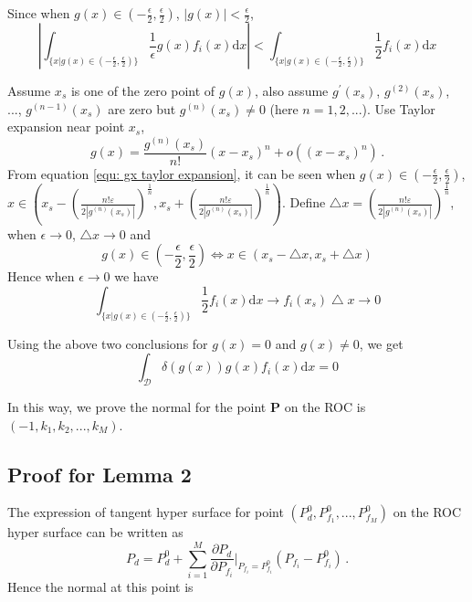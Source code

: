 \documentclass[12pt,journal,a4paper,twoside,onecolumn]{IEEEtran}
\begin{document}
\begin{spacing}{2.5}
Since when $g(x) \in (-\frac{\epsilon}{2}, \frac{\epsilon}{2})$, $|g(x)| < \frac{\epsilon}{2}$,
\begin{equation}|
\int_{\{x|g(x)\in (-\frac{\epsilon}{2}, \frac{\epsilon}{2})\}} \frac{1}{\epsilon} g(x)f_i(x) \mathrm{d}x | <
\int_{\{x|g(x)\in (-\frac{\epsilon}{2}, \frac{\epsilon}{2})\}} \frac{1}{2}f_i(x) \mathrm{d}x
\end{equation}

Assume $x_s$ is one of the zero point of $g(x)$, also assume $g^\prime(x_s)$, $g^{(2)}(x_s)$, ..., $g^{(n-1)}(x_s)$ are zero but $g^{(n)}(x_s) \neq 0$ (here $n = 1, 2, ...$). Use Taylor expansion near point $x_s$,
\begin{equation}
  \label{equ: gx taylor expansion}
  g(x) = \frac{g^{(n)}(x_s)}{n!}(x - x_s)^n + o((x - x_s)^n)\,.
\end{equation}
\def \LEFT{ x_s
  -\left(\frac{n!\varepsilon}{2|g^{(n)}(x_s)|}\right)^{\frac{1}{n}}}
  \def \RIGHT{ x_s
  +\left(\frac{n!\varepsilon}{2|g^{(n)}(x_s)|}\right)^{\frac{1}{n}}}
From equation \eqref{equ: gx taylor expansion}, it can be seen when $g(x)\in (-\frac{\epsilon}{2}, \frac{\epsilon}{2})$, $x \in \left(
      \LEFT, \RIGHT
  \right)$.  Define $\bigtriangleup x = \left(\frac{n!\varepsilon}{2|g^{(n)}(x_s)|}\right)^{\frac{1}{n}}$, when $\epsilon \rightarrow 0$, $\bigtriangleup x \rightarrow 0$ and
\begin{equation}
\label{pro: scale}
g(x) \in (-\frac{\epsilon}{2}, \frac{\epsilon}{2})  \Leftrightarrow x \in (x_s -\bigtriangleup x, x_s + \bigtriangleup x)
\end{equation}
 Hence when $\epsilon \rightarrow 0$ we have
\begin{equation}
\int_{\{x|g(x)\in (-\frac{\epsilon}{2}, \frac{\epsilon}{2})\}} \frac{1}{2}f_i(x) \mathrm{d}x \rightarrow
f_i(x_s)\bigtriangleup x \rightarrow 0
\end{equation}

Using the above two conclusions for $g(x) = 0$ and $g(x) \neq 0$, we get
\begin{equation}
\int_{\mathcal{D}} \delta (g(x)) g(x)f_i(x) \mathrm{d}x = 0
\end{equation}

In this way, we prove the normal for the point \textbf{P} on the ROC is $(-1, k_1, k_2, ..., k_M)$.

\subsection{Proof for Lemma 2}
The expression of tangent hyper surface for point $(P_d^0, P_{f_1}^0, ..., P_{f_M}^0)$ on the ROC hyper surface can be written as
\begin{equation}
P_d = P_d^0 + \sum_{i=1}^{M} \frac{\partial P_d}{\partial P_{f_i}}\bigg|_{P_{f_i} = P_{f_i}^0}(P_{f_i} - P_{f_i}^0)\,.
\end{equation}
Hence the normal at this point is


\end{spacing}
\end{document}
